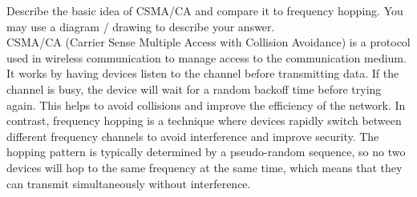 \begin{ejercicio}
    Describe the basic idea of CSMA/CA and compare it to frequency hopping. You may use a diagram / drawing to describe your answer.\\

    CSMA/CA (Carrier Sense Multiple Access with Collision Avoidance) is a protocol used in wireless communication to manage access to the communication medium. It works by having devices listen to the channel before transmitting data. If the channel is busy, the device will wait for a random backoff time before trying again. This helps to avoid collisions and improve the efficiency of the network. In contrast, frequency hopping is a technique where devices rapidly switch between different frequency channels to avoid interference and improve security. The hopping pattern is typically determined by a pseudo-random sequence, so no two devices will hop to the same frequency at the same time, which means that they can transmit simultaneously without interference.
\end{ejercicio}

